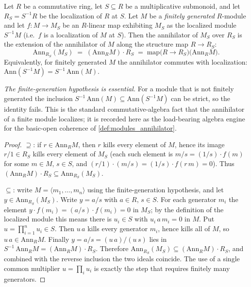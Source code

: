 \begin{lemma}
  \label{lem:annihilator_localization_eq_map}
  Let \(R\) be a commutative ring, let \(S \subseteq R\) be a multiplicative
  submonoid, and let \(R_S = S^{-1}R\) be the localization of \(R\) at \(S\). Let
  \(M\) be a \emph{finitely generated} \(R\)-module and let \(f : M \to M_S\) be
  an \(R\)-linear map exhibiting \(M_S\) as the localized module \(S^{-1}M\)
  (i.e.\ \(f\) is a localization of \(M\) at \(S\)). Then the annihilator of
  \(M_S\) over \(R_S\) is the extension of the annihilator of \(M\) along the
  structure map \(R \to R_S\):
  \[
    \mathrm{Ann}_{R_S}(M_S)
    \;=\; (\mathrm{Ann}_R M)\cdot R_S
    \;=\; \mathrm{map}\bigl(R \to R_S\bigr)\bigl(\mathrm{Ann}_R M\bigr).
  \]
  Equivalently, for finitely generated \(M\) the annihilator commutes with
  localization: \(\mathrm{Ann}(S^{-1}M) = S^{-1}\,\mathrm{Ann}(M)\).

  \emph{The finite-generation hypothesis is essential.} For a module that is not
  finitely generated the inclusion \(S^{-1}\,\mathrm{Ann}(M) \subseteq
  \mathrm{Ann}(S^{-1}M)\) can be strict, so the identity fails. This is the
  standard commutative-algebra fact that the annihilator of a finite module
  localizes; it is recorded here as the load-bearing algebra engine for the
  basic-open coherence of \cref{def:modules_annihilator}.
\end{lemma}

\begin{proof}
  \(\supseteq\): if \(r \in \mathrm{Ann}_R M\), then \(r\) kills every element of
  \(M\), hence its image \(r/1 \in R_S\) kills every element of \(M_S\) (each such
  element is \(m/s = (1/s)\cdot f(m)\) for some \(m \in M\), \(s \in S\), and
  \((r/1)\cdot(m/s) = (1/s)\cdot f(r\,m) = 0\)). Thus
  \((\mathrm{Ann}_R M)\cdot R_S \subseteq \mathrm{Ann}_{R_S}(M_S)\).

  \(\subseteq\): write \(M = \langle m_1, \dots, m_n\rangle\) using the
  finite-generation hypothesis, and let \(y \in \mathrm{Ann}_{R_S}(M_S)\). Write
  \(y = a/s\) with \(a \in R\), \(s \in S\). For each generator \(m_i\) the element
  \(y\cdot f(m_i) = (a/s)\cdot f(m_i) = 0\) in \(M_S\); by the definition of the
  localized module this means there is \(u_i \in S\) with \(u_i\,a\,m_i = 0\) in
  \(M\). Put \(u = \prod_{i=1}^n u_i \in S\). Then \(u\,a\) kills every generator
  \(m_i\), hence kills all of \(M\), so \(u\,a \in \mathrm{Ann}_R M\). Finally
  \(y = a/s = (u\,a)/(u\,s)\) lies in \(S^{-1}\,\mathrm{Ann}_R M =
  (\mathrm{Ann}_R M)\cdot R_S\). Therefore \(\mathrm{Ann}_{R_S}(M_S) \subseteq
  (\mathrm{Ann}_R M)\cdot R_S\), and combined with the reverse inclusion the two
  ideals coincide. The use of a single common multiplier \(u = \prod_i u_i\) is
  exactly the step that requires finitely many generators.
\end{proof}

